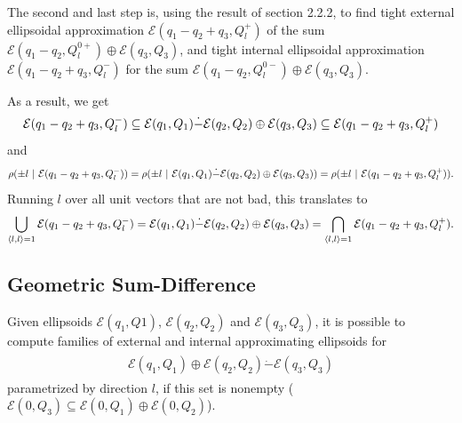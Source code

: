 \documentclass[letterpaper,10pt,english]{sphinxmanual}
\begin{document}
The second and last step is, using the result of section 2.2.2, to find
tight external ellipsoidal approximation
\({\mathcal E}(q_1-q_2+q_3,Q_l^+)\) of the sum
\({\mathcal E}(q_1-q_2,Q_l^{0+})\oplus{\mathcal E}(q_3,Q_3)\), and
tight internal ellipsoidal approximation
\({\mathcal E}(q_1-q_2+q_3,Q_l^-)\) for the sum
\({\mathcal E}(q_1-q_2,Q_l^{0-})\oplus{\mathcal E}(q_3,Q_3)\).

As a result, we get
\begin{gather}
\begin{split}{\mathcal E}(q_1-q_2+q_3,Q_l^-) \subseteq
{\mathcal E}(q_1,Q_1)\dot{-}{\mathcal E}(q_2,Q_2)\oplus{\mathcal E}(q_3,Q_3) \subseteq
{\mathcal E}(q_1-q_2+q_3,Q_l^+)\end{split}\notag
\end{gather}
and
\begin{gather}
\begin{split}\rho(\pm l ~|~{\mathcal E}(q_1-q_2+q_3,Q_l^-)) =
\rho(\pm l ~|~ {\mathcal E}(q_1,Q_1)\dot{-}{\mathcal E}(q_2,Q_2)\oplus{\mathcal E}(q_3,Q_3)) =
\rho(\pm l ~|~ {\mathcal E}(q_1-q_2+q_3,Q_l^+)).\end{split}\notag
\end{gather}
Running \(l\) over all unit vectors that are not bad, this
translates to
\begin{gather}
\begin{split}\bigcup_{\langle l,l\rangle=1} {\mathcal E}(q_1-q_2+q_3,Q_l^-) =
{\mathcal E}(q_1,Q_1)\dot{-}{\mathcal E}(q_2,Q_2)\oplus{\mathcal E}(q_3,Q_3) =
\bigcap_{\langle l,l\rangle=1} {\mathcal E}(q_1-q_2+q_3,Q_l^+) .\end{split}\notag
\end{gather}

\subsection{Geometric Sum-Difference}
\label{chap_ellcalc:sum-diff-label}\label{chap_ellcalc:geometric-sum-difference}
Given ellipsoids \({\mathcal E}(q_1,Q1)\),
\({\mathcal E}(q_2,Q_2)\) and \({\mathcal E}(q_3,Q_3)\), it is
possible to compute families of external and internal approximating
ellipsoids for
\label{chap_ellcalc:equation-minkpm}\begin{gather}
\begin{split}{\mathcal E}(q_1,Q_1) \oplus {\mathcal E}(q_2,Q_2) \dot{-} {\mathcal E}(q_3,Q_3)\end{split}\label{chap_ellcalc-minkpm}
\end{gather}
parametrized by direction \(l\), if this set is nonempty
(\({\mathcal E}(0,Q_3)\subseteq{\mathcal E}(0,Q_1)\oplus{\mathcal E}(0,Q_2)\)).
\end{document}
